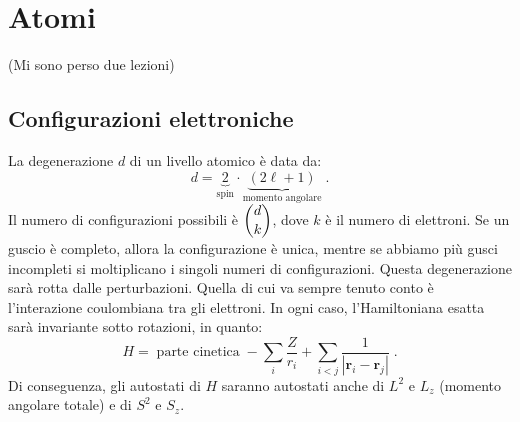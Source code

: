 \documentclass[10pt,a4paper]{report}
\theoremstyle{definition}
\numberwithin{equation}{section}
\begin{document}
\chapter{Atomi}
(Mi sono perso due lezioni)
\section{Configurazioni elettroniche}
La degenerazione $d$ di un livello atomico è data da:
\begin{equation}
d=\underbrace{2}_{\mbox{spin}}\cdot \underbrace{(2\ell +1)}_{\mbox{momento angolare}}\;.
\end{equation}
Il numero di configurazioni possibili è $\dbinom{d}{k}$, dove $k$ è il numero di elettroni. Se un guscio è completo, allora la configurazione è unica, mentre se abbiamo più gusci incompleti si moltiplicano i singoli numeri di configurazioni. Questa degenerazione sarà rotta dalle perturbazioni. Quella di cui va sempre tenuto conto è l'interazione coulombiana tra gli elettroni. In ogni caso, l'Hamiltoniana esatta sarà invariante sotto rotazioni, in quanto:
\begin{equation}
H=\;\mbox{parte cinetica}\;-\sum_i \frac{Z}{r_i}+\sum_{i<j}\frac{1}{|\mathbf{r}_i-\mathbf{r}_j|}\;.
\end{equation}
Di conseguenza, gli autostati di $H$ saranno autostati anche di $L^2$ e $L_z$ (momento angolare totale) e di $S^2$ e $S_z$.
\end{document}
